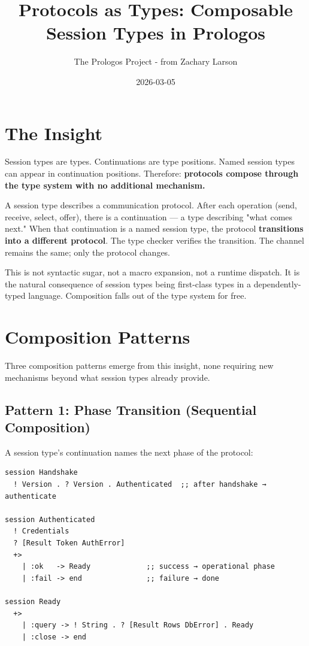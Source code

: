 \documentclass[11pt]{article}
\author{The Prologos Project - from Zachary Larson}
\date{2026-03-05}
\title{Protocols as Types: Composable Session Types in Prologos}
\begin{document}
\maketitle
\tableofcontents

\section{The Insight}
\label{sec:org1f97f50}

Session types are types. Continuations are type positions. Named session types
can appear in continuation positions. Therefore: \textbf{protocols compose through
the type system with no additional mechanism.}

A session type describes a communication protocol. After each operation (send,
receive, select, offer), there is a continuation --- a type describing "what
comes next." When that continuation is a named session type, the protocol
\textbf{transitions into a different protocol}. The type checker verifies the
transition. The channel remains the same; only the protocol changes.

This is not syntactic sugar, not a macro expansion, not a runtime dispatch. It
is the natural consequence of session types being first-class types in a
dependently-typed language. Composition falls out of the type system for free.
\section{Composition Patterns}
\label{sec:orgcd3a82a}

Three composition patterns emerge from this insight, none requiring new
mechanisms beyond what session types already provide.
\subsection{Pattern 1: Phase Transition (Sequential Composition)}
\label{sec:org1261dbb}

A session type's continuation names the next phase of the protocol:

\begin{verbatim}
session Handshake
  ! Version . ? Version . Authenticated  ;; after handshake → authenticate

session Authenticated
  ! Credentials
  ? [Result Token AuthError]
  +>
    | :ok   -> Ready             ;; success → operational phase
    | :fail -> end               ;; failure → done

session Ready
  +>
    | :query -> ! String . ? [Result Rows DbError] . Ready
    | :close -> end
\end{verbatim}
\end{document}
